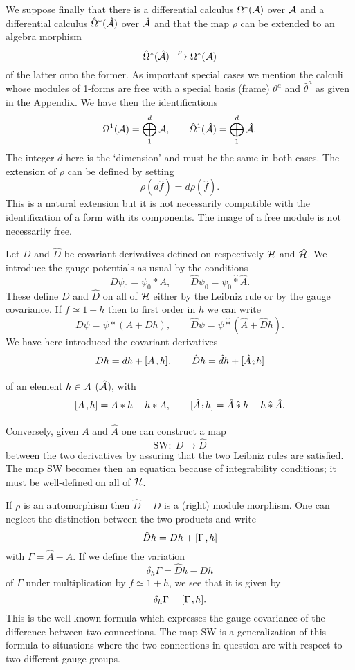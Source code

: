 \documentclass[a4paper,12pt]{article}
\def\h#1{\hat #1}
\def\c#1{{\cal #1}}
\def\wm{\mathbin{*}}
\def\hwm{\mathbin{\hat *}}
\def\k{\kern-.1em\mathbin{,}\kern-.1em}
\def\hk{\kern.12em\raise-1em\hbox{$\hat{\raise1em\hbox{,}}$}\kern.12em}
\begin{document}
We suppose finally that there is a differential calculus
$\Omega^*(\c{A})$ over $\c{A}$ and a differential calculus
$\h{\Omega}^*(\h{\c}{A})$ over $\h{\c}{A}$ and that the map $\rho$ can
be extended to an algebra morphism
$$
\h{\Omega}^*(\h{\c}{A}) 
\buildrel \rho \over \longrightarrow \Omega^*(\c{A})
$$
of the latter onto the former.  As important special cases we
mention the calculi whose modules of 1-forms are free with a special
basis (frame) $\theta^a$ and $\h{\theta}^a$ as given in the Appendix.
We have then the identifications
$$
\Omega^1(\c{A}) = \bigoplus_1^d \c{A}, \qquad
\h{\Omega}^1(\h{\c}{A}) = \bigoplus_1^d \h{\c}{A}.
$$
The integer $d$ here is the `dimension' and must be the same in
both cases. The extension of $\rho$ can be defined by setting
\begin{equation}
\rho (d \h{f}) = d\rho (\h{f}).                             \label{rhost}
\end{equation}
This is a natural extension but it is not necessarily compatible with
the identification of a form with its components. The image of a free
module is not necessarily free.

Let $D$ and $\h{D}$ be covariant derivatives defined on respectively
$\c{H}$ and $\h{\c{H}}$.  We introduce the gauge potentials as usual
by the conditions
$$
D \psi_0 = \psi_0 \wm A, \qquad \h{D} \psi_0 = \psi_0 \hwm \h{A}.
$$
These define $D$ and $\h{D}$ on all of $\c{H}$ either by the
Leibniz rule or by the gauge covariance. If $f \simeq 1 + h$ then to
first order in $h$ we can write
$$
D\psi = \psi \wm (A + Dh), \qquad 
\h{D}\psi = \psi \hwm (\h{A} + \h{D} h).
$$
We have here introduced the covariant derivatives
$$
Dh = dh + [A\k h], \qquad \h{D} h = \h{d}h + [\h{A}\hk h]
$$
of an element $h \in \c{A}$ ($\h{\c{A}}$), with
$$
[A\k h] = A\wm h - h\wm A, \qquad
[\h{A}\hk h] = \h{A} \hwm h - h \hwm \h{A}.
$$
Conversely, given $A$ and $\h{A}$ one can construct a
map~\cite{SeiWit99}
$$
\mbox{SW}: \; D \longrightarrow \h{D}
$$
between the two derivatives by assuring that the two Leibniz rules
are satisfied.  The map SW becomes then an equation because of
integrability conditions; it must be well-defined on all of $\c{H}$.

If $\rho$ is an automorphism then $\h{D} - D$ is a (right) module
morphism. One can neglect the distinction between the two products and
write
\begin{equation}
\h{D} h = D h + [\Gamma\k h]                           \label{Gamma0}
\end{equation}
with $\Gamma = \h{A} - A$. 
If we define the variation 
\begin{equation}
\delta_h \Gamma = \h{D} h - D h
\end{equation}
of $\Gamma$ under multiplication by $f \simeq 1 + h$, we see that it 
is given by
\begin{equation}
\delta_h \Gamma = [\Gamma\k h].                         \label{Gamma}
\end{equation}
This is the well-known formula which expresses the gauge covariance of
the difference between two connections. The map SW is a generalization
of this formula to situations where the two connections in question
are with respect to two different gauge groups.
\end{document}
